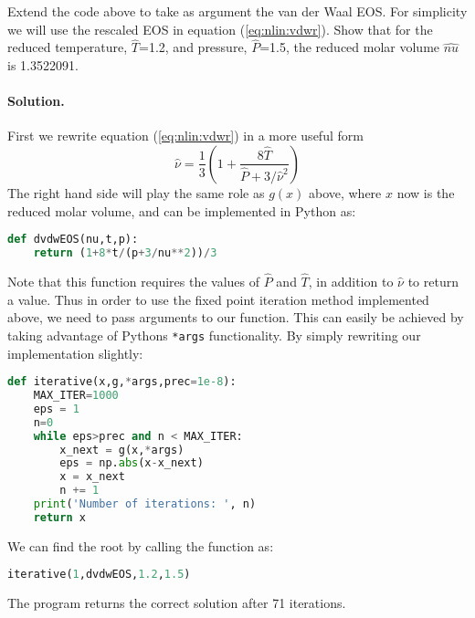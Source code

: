 \documentclass[graybox,sectrefs,envcountresetchap,open=right,final]{svmonodo}
\makeatletter
\newenvironment{doconceexercise}{}{}
\newcounter{doconceexercisecounter}%
\newcommand\listofexercises{
\chapter*{List of Exercises
          \@mkboth{List of Exercises}{List of Exercises}}
\markboth{List of Exercises}{List of Exercises}
\@starttoc{loe}
}
\makeatother
\begin{document}
\begin{doconceexercise}

                             

Extend the code above to take as argument the van der Waal EOS. For simplicity we will use the rescaled EOS in equation (\ref{eq:nlin:vdwr}). Show that for the reduced temperature, $\hat{T}$=1.2, and pressure, $\hat{P}$=1.5, the reduced molar volume $\hat{nu}$ is 1.3522091.

\paragraph{Solution.}
First we rewrite equation (\ref{eq:nlin:vdwr}) in a more useful form
\begin{equation}
\hat{\nu}=\frac{1}{3}(1+\frac{8\hat{T}}{\hat{P}+3/\hat{\nu}^2})
\label{eq:nlin:sp}
\end{equation}
The right hand side will play the same role as $g(x)$ above, where $x$ now is the reduced molar volume, and can be implemented in Python as:



\begin{lstlisting}[language=python,style=blue1]
def dvdwEOS(nu,t,p):
    return (1+8*t/(p+3/nu**2))/3

\end{lstlisting}

Note that this function requires the values of $\hat{P}$ and $\hat{T}$, in addition to $\hat{\nu}$ to return a value. Thus in order to use the fixed point iteration method implemented above, we need to pass arguments to our function. This can easily be achieved by taking advantage of Pythons \texttt{*args} functionality. By simply rewriting our implementation slightly:












\begin{lstlisting}[language=python,style=blue1]
def iterative(x,g,*args,prec=1e-8):
    MAX_ITER=1000
    eps = 1
    n=0
    while eps>prec and n < MAX_ITER:
        x_next = g(x,*args)
        eps = np.abs(x-x_next)
        x = x_next
        n += 1
    print('Number of iterations: ', n)
    return x

\end{lstlisting}

We can find the root by calling the function as:


\begin{lstlisting}[language=python,style=blue1bar]
iterative(1,dvdwEOS,1.2,1.5)

\end{lstlisting}

The program returns the correct solution after 71 iterations.


\end{doconceexercise}
\end{document}
